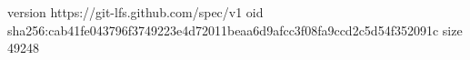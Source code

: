 version https://git-lfs.github.com/spec/v1
oid sha256:cab41fe043796f3749223e4d72011beaa6d9afcc3f08fa9ccd2c5d54f352091c
size 49248
